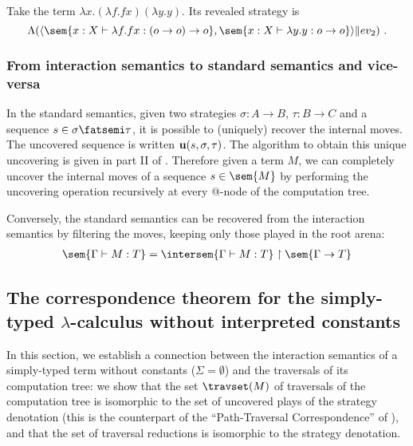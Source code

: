 \begin{example}
Take the term $\lambda x . (\lambda f . f x) (\lambda y . y)$.
Its revealed strategy is $$\Lambda ( \langle \sem{ x:X \vdash \lambda f . f
x : (o\rightarrow o) \rightarrow o} , \sem{ x:X \vdash \lambda y . y
: o \rightarrow o} \rangle \| ev_2 ) \ .$$
\end{example}


\subsubsection{From interaction semantics to standard semantics and vice-versa}

In the standard semantics, given two strategies $\sigma : A
\rightarrow B$, $\tau : B \rightarrow C$ and a sequence $s \in
\sigma \fatsemi \tau$, it is possible to (uniquely) recover the
internal moves. The uncovered sequence is written ${\bf u}(s,
\sigma, \tau)$. The algorithm to obtain this unique uncovering is
given in part II of \cite{hylandong_pcf}. Therefore given a term
$M$, we can completely uncover the internal moves of a sequence
$s\in\sem{M}$ by performing the uncovering operation recursively at
every @-node of the computation tree.

Conversely, the standard semantics can be recovered from the
interaction semantics by filtering the moves, keeping only those
played in the root arena:
\begin{eqnarray}
 \sem{\Gamma \vdash M : T} = \intersem{\Gamma \vdash M : T} \upharpoonright \sem{\Gamma \rightarrow T} \label{eqn:int_std_gamsem}
\end{eqnarray}

\subsection{The correspondence theorem for the simply-typed $\lambda$-calculus without interpreted constants}
In this section, we establish a connection between the interaction
semantics of a simply-typed term without constants ($\Sigma =
\emptyset$) and the traversals of its computation tree: we show that
the set $\travset(M)$ of traversals of the computation tree is
isomorphic to the set of uncovered plays of the strategy denotation
(this is the counterpart of the ``Path-Traversal Correspondence'' of
\cite{OngLics2006}), and that the set of traversal reductions is
isomorphic to the strategy denotation.

